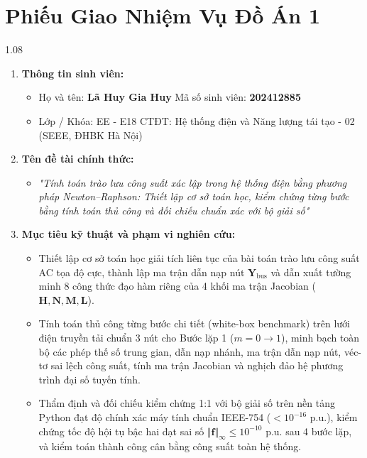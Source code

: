 \documentclass[12pt,a4paper,oneside]{report}
\begin{document}
\chapter*{Phiếu Giao Nhiệm Vụ Đồ Án 1}

\begin{spacing}{1.08}
\begin{enumerate}\setlength{\itemsep}{1pt}\setlength{\parskip}{0pt}
    \item \textbf{Thông tin sinh viên:}
    \begin{itemize}\setlength{\itemsep}{0pt}\setlength{\parskip}{0pt}
        \item Họ và tên: \textbf{Lã Huy Gia Huy} \quad Mã số sinh viên: \textbf{202412885}
        \item Lớp / Khóa: EE - E18 \quad CTĐT: Hệ thống điện và Năng lượng tái tạo - 02 (SEEE, ĐHBK Hà Nội)
    \end{itemize}
    \item \textbf{Tên đề tài chính thức:}
    \begin{itemize}\setlength{\itemsep}{0pt}\setlength{\parskip}{0pt}
        \item \textit{"Tính toán trào lưu công suất xác lập trong hệ thống điện bằng phương pháp Newton--Raphson: Thiết lập cơ sở toán học, kiểm chứng từng bước bằng tính toán thủ công và đối chiếu chuẩn xác với bộ giải số"}
    \end{itemize}
    \item \textbf{Mục tiêu kỹ thuật và phạm vi nghiên cứu:}
    \begin{itemize}\setlength{\itemsep}{0pt}\setlength{\parskip}{0pt}
        \item Thiết lập cơ sở toán học giải tích liên tục của bài toán trào lưu công suất AC tọa độ cực, thành lập ma trận dẫn nạp nút $\mathbf{Y}_{\text{bus}}$ và dẫn xuất tường minh 8 công thức đạo hàm riêng của 4 khối ma trận Jacobian ($\mathbf{H}, \mathbf{N}, \mathbf{M}, \mathbf{L}$).
        \item Tính toán thủ công từng bước chi tiết (white-box benchmark) trên lưới điện truyền tải chuẩn 3 nút cho Bước lặp 1 ($m = 0 \to 1$), minh bạch toàn bộ các phép thế số trung gian, dẫn nạp nhánh, ma trận dẫn nạp nút, véc-tơ sai lệch công suất, tính ma trận Jacobian và nghịch đảo hệ phương trình đại số tuyến tính.
        \item Thẩm định và đối chiếu kiểm chứng 1:1 với bộ giải số trên nền tảng Python đạt độ chính xác máy tính chuẩn IEEE-754 ($< 10^{-16}\text{ p.u.}$), kiểm chứng tốc độ hội tụ bậc hai đạt sai số $\Vert \mathbf{f} \Vert_\infty \le 10^{-10}\text{ p.u.}$ sau 4 bước lặp, và kiểm toán thành công cân bằng công suất toàn hệ thống.

\end{itemize}
\end{enumerate}
\end{spacing}
\end{document}
